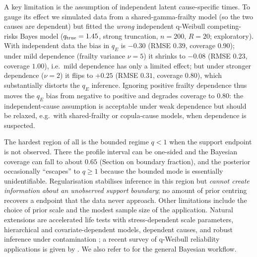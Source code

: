 \documentclass[ASNA,twocolumn]{USG}
\begin{document}
A key limitation is the assumption of independent latent cause-specific
times. To gauge its effect we simulated data from a shared-gamma-frailty
model (so the two causes are dependent) but fitted the \emph{wrong}
independent q-Weibull competing-risks Bayes model ($q_{\rm true}=1.45$,
strong truncation, $n=200$, $R=20$; exploratory). With independent data the
bias in $q_E$ is $-0.30$ (RMSE $0.39$, coverage $0.90$); under mild
dependence (frailty variance $\nu=5$) it shrinks to $-0.08$ (RMSE $0.23$,
coverage $1.00$), i.e.\ mild dependence has only a limited effect; but
under stronger dependence ($\nu=2$) it flips to $+0.25$ (RMSE $0.31$,
coverage $0.80$), which substantially distorts the $q_E$ inference.
Ignoring positive frailty dependence thus moves the $q_E$ bias from negative
to positive and degrades coverage to $0.80$: the independent-cause
assumption is acceptable under weak dependence but should be relaxed,
e.g.\ with shared-frailty or copula-cause models, when dependence is
suspected.

The hardest region of all is the bounded regime $q<1$ when the support
endpoint is not observed. There the profile interval can be one-sided and
the Bayesian coverage can fall to about $0.65$ (Section on boundary
fraction), and the posterior occasionally ``escapes'' to $q\ge1$ because
the bounded mode is essentially unidentifiable. Regularisation stabilises
inference in this region but \emph{cannot create information about an
unobserved support boundary}; no amount of prior centring recovers a
endpoint that the data never approach. Other limitations
include the choice of prior scale and the modest sample size of the
application.
Natural extensions are accelerated life tests with stress-dependent scale
parameters, hierarchical and covariate-dependent models, dependent causes,
and robust inference under contamination \cite{qre70113}; a recent survey of
q-Weibull reliability applications is given by \cite{ieeetr2025qw}. We also
refer to \cite{gelman2014} for the general Bayesian workflow.

\end{document}
